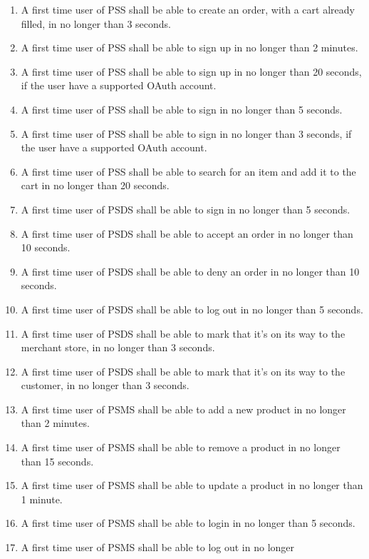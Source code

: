 \begin{enumerate}[label=USE-\arabic*]
    \item A first time user of PSS shall be able to create an order, with a 
    cart already filled, in no longer than 3 seconds.
    \item A first time user of PSS shall be able to sign up in no longer 
    than 2 minutes.
    \item A first time user of PSS shall be able to sign up in no longer 
    than 20 seconds, if the user have a supported OAuth account.
    \item A first time user of PSS shall be able to sign in no longer 
    than 5 seconds.
    \item A first time user of PSS shall be able to sign in no longer 
    than 3 seconds, if the user have a supported OAuth account.
    \item A first time user of PSS shall be able to search for an item and 
    add it to the cart in no longer than 20 seconds.
    \item A first time user of PSDS shall be able to sign in no longer 
    than 5 seconds.
    \item A first time user of PSDS shall be able to accept an order in no 
    longer than 10 seconds.
    \item A first time user of PSDS shall be able to deny an order in no 
    longer than 10 seconds.
    \item A first time user of PSDS shall be able to log out in no longer 
    than 5 seconds.
    \item A first time user of PSDS shall be able to mark that it’s on its 
    way to the merchant store, in no longer than 3 seconds.
    \item A first time user of PSDS shall be able to mark that it’s on its 
    way to the customer, in no longer than 3 seconds.
    \item A first time user of PSMS shall be able to add a new product in 
    no longer than 2 minutes.
    \item A first time user of PSMS shall be able to remove a product in 
    no longer than 15 seconds.
    \item A first time user of PSMS shall be able to update a product in 
    no longer than 1 minute.
    \item A first time user of PSMS shall be able to login in no longer 
    than 5 seconds.
    \item A first time user of PSMS shall be able to log out in no longer 

\end{enumerate}
